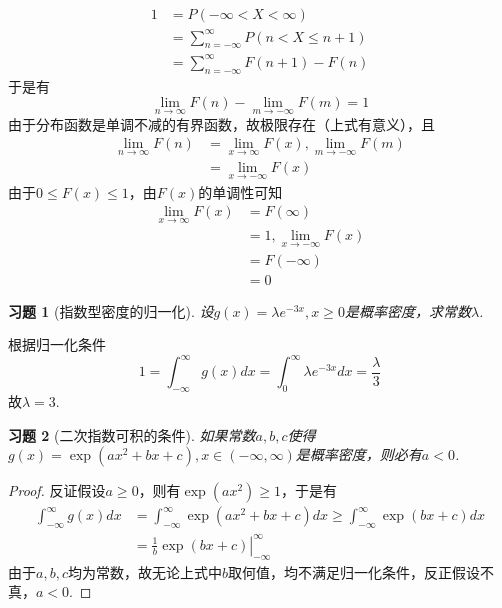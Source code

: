 \documentclass[UTF8,12pt,a4paper,fontset=fandol]{ctexart}
\newtheorem{exercise}{习题}[section]
\begin{document}
\begin{solve}\label{a:Y3.1}
\[\begin{aligned}1&=P( - \infty  < X < \infty ) \\&= \sum\limits_{n =  - \infty }^\infty  {P(n < X \leqslant n + 1)}  \\&= \sum\limits_{n =  - \infty }^\infty  {F(n + 1) - F(n)} \end{aligned}\]
于是有
\[\mathop {\lim }\limits_{n \to \infty } F(n) - \mathop {\lim }\limits_{m \to  - \infty } F(m) = 1\]
由于分布函数是单调不减的有界函数，故极限存在（上式有意义），且
\[\begin{aligned}\mathop {\lim }\limits_{n \to   \infty } F\left( n \right) &= \mathop {\lim }\limits_{x \to   \infty } F(x),\mathop {\lim }\limits_{m \to  - \infty } F\left( m \right) \\&= \mathop {\lim }\limits_{x \to  - \infty } F(x)\end{aligned}\]
由于$0\leqslant F(x)\leqslant 1$，由$F(x)$的单调性可知
\[\begin{aligned}\mathop {\lim }\limits_{x \to \infty } F(x) &= F(\infty ) \\&= 1,\mathop {\lim }\limits_{x \to  - \infty } F(x) \\&= F( - \infty ) \\&= 0\end{aligned}\]
\end{solve}

\begin{exercise}[指数型密度的归一化]\label{q:Y3.2}
设$g(x)=\lambda e^{-3x},x\geqslant 0$是概率密度，求常数$\lambda$.\par{}
\end{exercise}

\begin{solve}\label{a:Y3.2}
根据归一化条件
\[1 = \int_{ - \infty }^\infty  {g(x)dx}  = \int_0^\infty  {\lambda {e^{ - 3x}}dx}  = \frac{\lambda }{3}\]
故$\lambda=3$.
\end{solve}

\begin{exercise}[二次指数可积的条件]\label{q:Y3.3}
如果常数$a,b,c$使得$g(x)=\exp(ax^2+bx+c),x\in (-\infty,\infty)$是概率密度，则必有$a<0$.\par{}
\end{exercise}

\begin{proof}\label{a:Y3.3}
反证假设$a\geqslant 0$，则有$\exp(ax^2)\geqslant 1$，于是有
\[\begin{aligned}\int_{ - \infty }^\infty  {g(x)dx}  &= \int_{ - \infty }^\infty  {\exp (a{x^2} + bx + c)dx}  \geqslant \int_{ - \infty }^\infty  {\exp (bx + c)dx}  \\&= \left. {\frac{1}{b}\exp (bx + c)} \right|_{ - \infty }^\infty \end{aligned}\]
由于$a,b,c$均为常数，故无论上式中$b$取何值，均不满足归一化条件，反正假设不真，$a<0$.
\end{proof}
\end{document}
